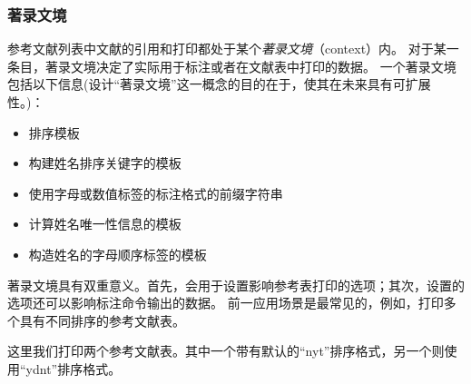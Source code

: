 \subsubsection{著录文境}%
\label{use:bib:context}


参考文献列表中文献的引用和打印都处于某个\emph{著录文境}（context）内。
对于某一条目，著录文境决定了实际用于标注或者在文献表中打印的数据。
一个著录文境包括以下信息(设计“著录文境”这一概念的目的在于，使其在未来具有可扩展性。)：

\begin{itemize}
 \item %
 排序模板
 \item %
 构建姓名排序关键字的模板
 \item %
 使用字母或数值标签的标注格式的前缀字符串
 \item %
 计算姓名唯一性信息的模板
 \item %
 构造姓名的字母顺序标签的模板
\end{itemize}
%
著录文境具有双重意义。首先，会用于设置影响参考表打印的选项；其次，设置的选项还可以影响标注命令输出的数据。
前一应用场景是最常见的，例如，打印多个具有不同排序的参考文献表。

\begin{ltxexample}
\usepackage[sorting=nyt]{biblatex}

\cite{one}
\cite{two}
\printbibliography
\newrefcontext[sorting=ydnt]
\printbibliography
\end{ltxexample}
%
这里我们打印两个参考文献表。其中一个带有默认的“nyt”排序格式，另一个则使用“ydnt”排序格式。

